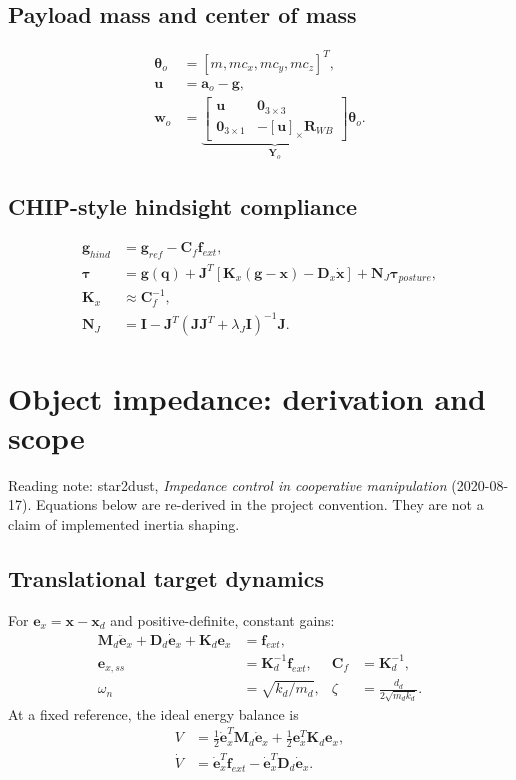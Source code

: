 \documentclass[11pt]{article}
\newcommand{\vect}[1]{\bm{#1}}
\newcommand{\skewm}[1]{[#1]_{\times}}
\begin{document}
\subsection*{Payload mass and center of mass}
\begin{align}
\vect\theta_o&=[m,mc_x,mc_y,mc_z]^T, \tag{PAY-01}\\
\vect u&=\vect a_o-\vect g, \tag{PAY-02}\\
\vect w_o&=
\underbrace{\begin{bmatrix}
\vect u&\vect0_{3\times3}\\
\vect0_{3\times1}&-\skewm{\vect u}\vect R_{WB}
\end{bmatrix}}_{\vect Y_o}\vect\theta_o. \tag{PAY-04}
\end{align}

\subsection*{CHIP-style hindsight compliance}
\begin{align}
\vect g_{hind}&=\vect g_{ref}-\vect C_f\vect f_{ext}, \tag{CHIP-01}\\
\vect\tau&=\vect g(\vect q)
+\vect J^T[\vect K_x(\vect g-\vect x)-\vect D_x\dot{\vect x}]
+\vect N_J\vect\tau_{posture}, \tag{CHIP-04}\\
\vect K_x&\approx\vect C_f^{-1}, \tag{CHIP-05}\\
\vect N_J&=\vect I-\vect J^T
(\vect J\vect J^T+\lambda_J\vect I)^{-1}\vect J. \tag{CHIP-06}
\end{align}

\clearpage
\section*{Object impedance: derivation and scope}
\noindent Reading note: star2dust, \emph{Impedance control in cooperative
manipulation} (2020-08-17). Equations below are re-derived in the project
convention. They are not a claim of implemented inertia shaping.

\subsection*{Translational target dynamics}
For $\vect e_x=\vect x-\vect x_d$ and positive-definite, constant gains:
\begin{align}
\vect M_d\ddot{\vect e}_x+\vect D_d\dot{\vect e}_x
+\vect K_d\vect e_x&=\vect f_{ext}, \tag{IMP-01}\\
\vect e_{x,ss}&=\vect K_d^{-1}\vect f_{ext},
&\vect C_f&=\vect K_d^{-1}, \tag{IMP-02}\\
\omega_n&=\sqrt{k_d/m_d},
&\zeta&=\frac{d_d}{2\sqrt{m_d k_d}}. \tag{IMP-03}
\end{align}
At a fixed reference, the ideal energy balance is
\begin{equation}
\begin{split}
V&=\tfrac12\dot{\vect e}_x^T\vect M_d\dot{\vect e}_x
+\tfrac12\vect e_x^T\vect K_d\vect e_x,\\
\dot V&=\dot{\vect e}_x^T\vect f_{ext}
-\dot{\vect e}_x^T\vect D_d\dot{\vect e}_x.
\end{split}\tag{IMP-04}
\end{equation}
\end{document}
